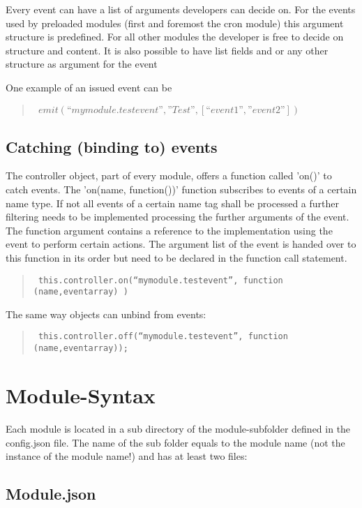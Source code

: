 Every event can have a list of arguments developers can decide on. For the events used by 
preloaded modules (first and foremost the cron module) this argument structure is 
predefined. For all other modules the developer is free to decide on structure and content. 
It is also possible to have list fields and or any other structure as argument for the event

One example of an issued event can be 

\begin{quote}
{\tt  
$emit(“mymodule.testevent”,”Test”,[“event1”,”event2”])$
}
\end{quote}

\subsection{Catching (binding to) events}

The controller object, part of every module, offers a function called 'on()' to catch events. 
The 'on(name, function())' function subscribes to events of a certain name type. If not 
all  events of a certain name tag shall be processed a further filtering needs to be 
implemented  processing  the further arguments of the event. The function argument contains a reference 
to the implementation using the event to perform certain actions. The argument list of the event is 
handed over to this function in its order but need to be declared in the function call statement.

\begin{quote}
{\tt  
this.controller.on(“mymodule.testevent”, function (name,eventarray) {})
}
\end{quote}

The same way objects can unbind from events:

\begin{quote}
{\tt  
this.controller.off(“mymodule.testevent”, function (name,eventarray));
}
\end{quote}


\section{Module-Syntax}

Each module is located in a sub directory of the module-subfolder defined in the config.json file.
The name of the sub folder equals to the module name (not the instance of the module name!) 
and has at least two files:

\subsection{Module.json}

